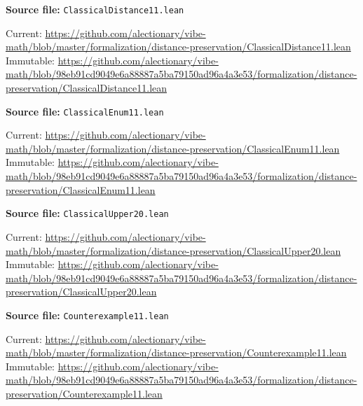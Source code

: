 \par\smallskip\noindent\begin{minipage}{\linewidth}\small\setlength{\baselineskip}{11pt}
\textbf{Source file:} \nolinkurl{ClassicalDistance11.lean}\par\nopagebreak
Current: \url{https://github.com/alectionary/vibe-math/blob/master/formalization/distance-preservation/ClassicalDistance11.lean}\\
Immutable: \url{https://github.com/alectionary/vibe-math/blob/98eb91cd9049e6a88887a5ba79150ad96a4a3e53/formalization/distance-preservation/ClassicalDistance11.lean}\par\end{minipage}\par
\par\smallskip\noindent\begin{minipage}{\linewidth}\small\setlength{\baselineskip}{11pt}
\textbf{Source file:} \nolinkurl{ClassicalEnum11.lean}\par\nopagebreak
Current: \url{https://github.com/alectionary/vibe-math/blob/master/formalization/distance-preservation/ClassicalEnum11.lean}\\
Immutable: \url{https://github.com/alectionary/vibe-math/blob/98eb91cd9049e6a88887a5ba79150ad96a4a3e53/formalization/distance-preservation/ClassicalEnum11.lean}\par\end{minipage}\par
\par\smallskip\noindent\begin{minipage}{\linewidth}\small\setlength{\baselineskip}{11pt}
\textbf{Source file:} \nolinkurl{ClassicalUpper20.lean}\par\nopagebreak
Current: \url{https://github.com/alectionary/vibe-math/blob/master/formalization/distance-preservation/ClassicalUpper20.lean}\\
Immutable: \url{https://github.com/alectionary/vibe-math/blob/98eb91cd9049e6a88887a5ba79150ad96a4a3e53/formalization/distance-preservation/ClassicalUpper20.lean}\par\end{minipage}\par
\par\smallskip\noindent\begin{minipage}{\linewidth}\small\setlength{\baselineskip}{11pt}
\textbf{Source file:} \nolinkurl{Counterexample11.lean}\par\nopagebreak
Current: \url{https://github.com/alectionary/vibe-math/blob/master/formalization/distance-preservation/Counterexample11.lean}\\
Immutable: \url{https://github.com/alectionary/vibe-math/blob/98eb91cd9049e6a88887a5ba79150ad96a4a3e53/formalization/distance-preservation/Counterexample11.lean}\par\end{minipage}\par
